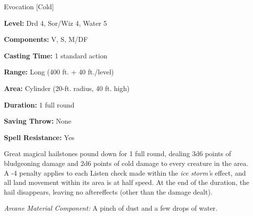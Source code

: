 
Evocation [Cold]

\textbf{Level:} Drd 4, Sor/Wiz 4, Water 5

\textbf{Components:} V, S, M/DF

\textbf{Casting Time:} 1 standard action

\textbf{Range:} Long (400 ft. + 40 ft./level)

\textbf{Area:} Cylinder (20-ft. radius, 40 ft. high)

\textbf{Duration:} 1 full round

\textbf{Saving Throw:} None

\textbf{Spell Resistance:} Yes

Great magical hailstones pound down for 1 full round, dealing 3d6 points of bludgeoning 
damage and 2d6 points of cold damage to every creature in the area. A -4 penalty 
applies to each Listen check made within the \textit{ice storm'}s effect, and all 
land movement within its area is at half speed. At the end of the duration, the 
hail disappears, leaving no aftereffects (other than the damage dealt).

\textit{Arcane Material Component:} A pinch of dust and a few drops of water.

